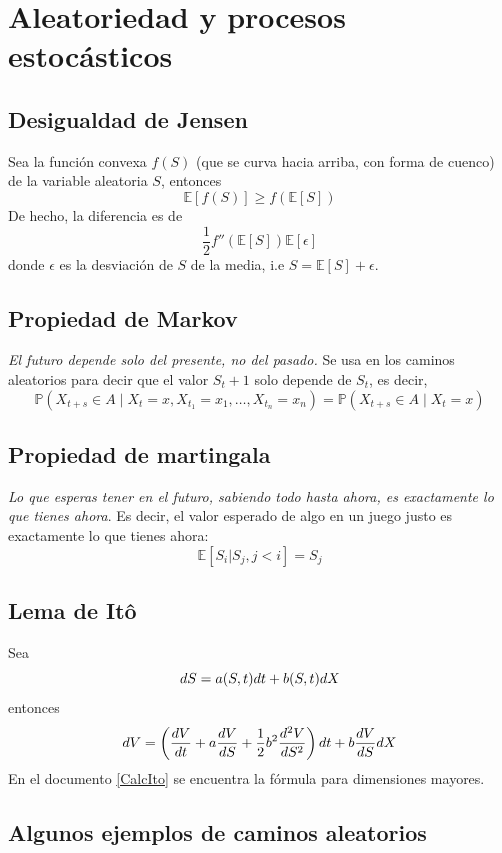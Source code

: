 
\section{Aleatoriedad y procesos estocásticos}

\subsection{Desigualdad de Jensen}
Sea la función convexa $f(S)$ (que se curva hacia arriba, con forma de cuenco) de la variable aleatoria $S$, entonces
$$\mathbb{E}[f(S)] \geq f(\mathbb{E}[S])$$
De hecho, la diferencia es de
$$\frac{1}{2}f''(\mathbb{E}[S])\mathbb{E}[\epsilon]$$
donde $\epsilon$ es la desviación de $S$ de la media, i.e $S=\mathbb{E}[S]+\epsilon$.


\subsection{Propiedad de Markov}
\textit{El futuro depende solo del presente, no del pasado.} Se usa en los caminos aleatorios para decir que el valor $S_t+1$ solo depende de $S_t$, es decir,
$$\mathbb{P}(X_{t+s} \in A \mid X_t = x, X_{t_1} = x_1, \ldots, X_{t_n} = x_n) 
= \mathbb{P}(X_{t+s} \in A \mid X_t = x)$$



\subsection{Propiedad de martingala}
\textit{Lo que esperas tener en el futuro, sabiendo todo hasta ahora, es exactamente lo que tienes ahora}. Es decir, el valor esperado de algo en un juego justo es exactamente lo que tienes ahora:
$$\mathbb{E}[S_i|S_j, j<i]=S_j$$



\subsection{Lema de Itô} \label{Ito}
Sea
$$dS = a(S,t)dt + b(S,t)d\mathnormal{X}$$
entonces
$$dV = \left( \frac{dV}{dt} +  a\frac{dV}{dS} + \frac{1}{2}b^2\frac{d^2V}{dS^2} \right)dt + b\frac{dV}{dS}d\mathnormal{X}$$
En el documento \ref{CalcIto} se encuentra la fórmula para dimensiones mayores.

\subsection{Algunos ejemplos de caminos aleatorios}

